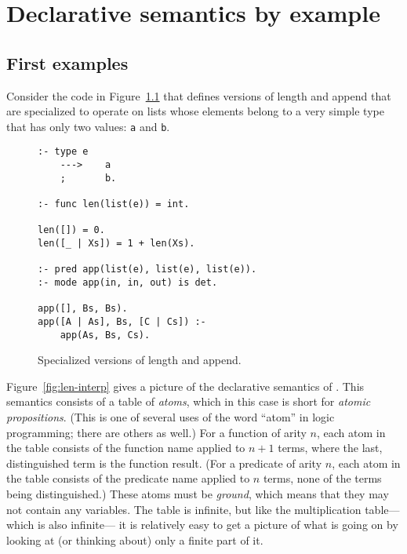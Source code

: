 \chapter{Declarative semantics by example}
\label{sec:by-example}

\section{First examples}
\label{sec:first-examples}

Consider the code in Figure~\ref{fig:len-app}
that defines versions of length and append
that are specialized to operate on lists
whose elements belong to a very simple type
that has only two values: \verb#a# and \verb#b#.

\begin{figure}[htb]
\begin{verbatim}
:- type e
    --->    a
    ;       b.

:- func len(list(e)) = int.

len([]) = 0.
len([_ | Xs]) = 1 + len(Xs).

:- pred app(list(e), list(e), list(e)).
:- mode app(in, in, out) is det.

app([], Bs, Bs).
app([A | As], Bs, [C | Cs]) :-
    app(As, Bs, Cs).
\end{verbatim}
\caption{Specialized versions of length and append.\label{fig:len-app}}
\end{figure}

Figure~\ref{fig:len-interp} gives a picture
of the declarative semantics of .
This semantics consists of a table of \emph{atoms},
which in this case is short for \emph{atomic propositions}.
(This is one of several uses of the word ``atom'' in logic programming;
there are others as well.)
For a function of arity $n$, each atom in the table
consists of the function name applied to $n + 1$ terms,
where the last, distinguished term is the function result.
(For a predicate of arity $n$, each atom in the table
consists of the predicate name applied to $n$ terms,
none of the terms being distinguished.)
These atoms must be \emph{ground},
which means that they may not contain any variables.
The table is infinite,
but like the multiplication table---which is also infinite---%
it is relatively easy to get a picture of what is going on
by looking at (or thinking about) only a finite part of it.

